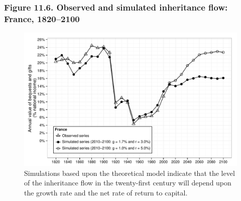 \documentclass[t]{beamer}\usepackage[]{graphicx}\usepackage[]{color}
\newenvironment{knitrout}{}{} %
\begin{document}
\begin{frame}[label=Figure_11_6]
\frametitle{Figure 11.6. Observed and simulated inheritance flow: France, 1820--2100}
\begin{figure}[t]
\begin{minipage}[b]{\textwidth}
\centering
\begin{knitrout}\footnotesize
{}\color{fgcolor}

{\centering \includegraphics[width=1\linewidth]{figures/bw/Figure_11_6} 

}



\end{knitrout}
\caption{Simulations based upon the theoretical model indicate that the level of the inheritance flow in the twenty-first century will depend upon the growth rate and the net rate of return to capital.}
\end{minipage}
\end{figure}
\end{frame}
\end{document}
